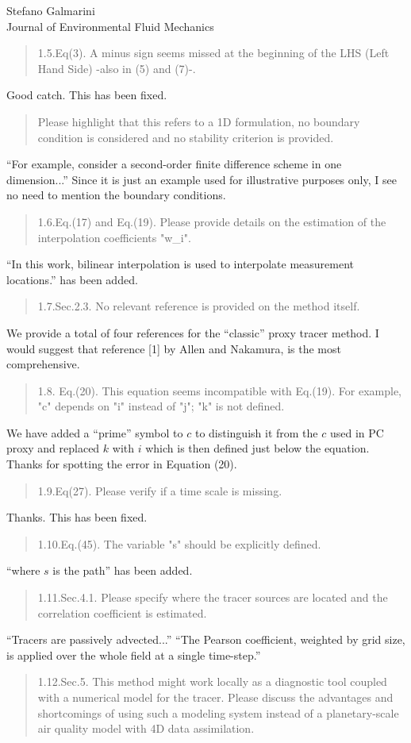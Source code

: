 \documentclass{letter}
\begin{document}
\begin{letter}{Stefano Galmarini\\
Journal of Environmental Fluid Mechanics}
\begin{quote}
1.5.Eq(3). A minus sign seems missed at the beginning of the LHS (Left Hand Side) -also in (5) and (7)-.
\end{quote}
Good catch. This has been fixed.
\begin{quote}
Please highlight that this refers to a 1D formulation, no boundary condition is considered and no stability criterion is provided.
\end{quote}
``For example, consider a second-order finite difference scheme in one dimension...''
Since it is just an example used for illustrative purposes only, I see no need to mention the boundary conditions.
\begin{quote}
1.6.Eq.(17) and Eq.(19). Please provide details on the estimation of the interpolation coefficients "w_i".
\end{quote}
``In this work, bilinear interpolation is used to interpolate measurement
locations.'' has been added.
\begin{quote}
1.7.Sec.2.3. No relevant reference is provided on the method itself.
\end{quote}
We provide a total of four references for the ``classic'' proxy tracer method.
I would suggest that reference [1] by Allen and Nakamura, is the most
comprehensive.
\begin{quote}
1.8. Eq.(20). This equation seems incompatible with Eq.(19). For example, "c" depends on "i" instead of "j"; "k" is not defined.
\end{quote}
We have added a ``prime'' symbol to $c$ to distinguish it from the $c$ used in
PC proxy and replaced $k$ with $i$ which is then defined just below the equation. Thanks for spotting the error in Equation (20).
\begin{quote}
1.9.Eq(27). Please verify if a time scale is missing.
\end{quote}
Thanks. This has been fixed.
\begin{quote}
1.10.Eq.(45). The variable "s" should be explicitly defined.
\end{quote}
``where $s$ is the path'' has been added.
\begin{quote}
1.11.Sec.4.1. Please specify where the tracer sources are located and the correlation coefficient is estimated.
\end{quote}
``Tracers are passively advected...''
``The Pearson coefficient, weighted by grid size, is applied over the whole field at a single time-step.''
\begin{quote}
1.12.Sec.5. This method might work locally as a diagnostic tool coupled with a numerical model for the tracer. Please discuss the advantages and shortcomings of using such a modeling system instead of a planetary-scale air quality model with 4D data assimilation.

\end{quote}
\end{letter}
\end{document}

